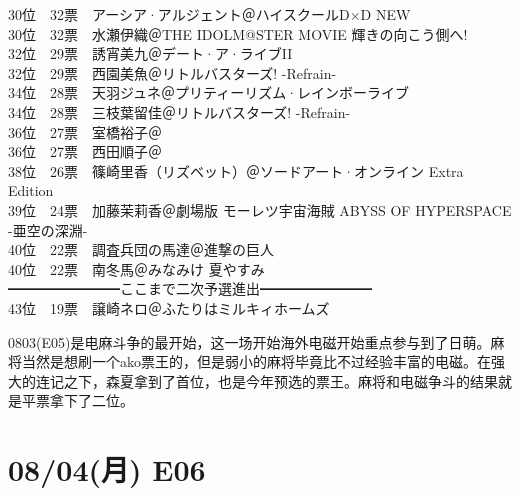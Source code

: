 {    30位　32票　アーシア·アルジェント＠ハイスクールD×D NEW\\
    30位　32票　水瀬伊織＠THE IDOLM@STER MOVIE 輝きの向こう側へ!\\
    32位　29票　誘宵美九＠デート·ア·ライブII\\
    32位　29票　西園美魚＠リトルバスターズ! -Refrain-\\
    34位　28票　天羽ジュネ＠プリティーリズム·レインボーライブ\\
    34位　28票　三枝葉留佳＠リトルバスターズ! -Refrain-\\
    36位　27票　室橋裕子＠\Saki\\
    36位　27票　西田順子＠\Saki\\
    38位　26票　篠崎里香（リズベット）＠ソードアート·オンライン Extra Edition\\
    39位　24票　加藤茉莉香＠劇場版 モーレツ宇宙海賊 ABYSS OF HYPERSPACE -亜空の深淵-\\
    40位　22票　調査兵団の馬達＠進撃の巨人\\
    40位　22票　南冬馬＠みなみけ 夏やすみ\\
    ━━━━━━━━ここまで二次予選進出━━━━━━━━\\
    43位　19票　譲崎ネロ＠ふたりはミルキィホームズ
}

0803(E05)是电麻斗争的最开始，这一场开始海外电磁开始重点参与到了日萌。麻将当然是想刷一个ako票王的，但是弱小的麻将毕竟比不过经验丰富的电磁。在强大的连记之下，森夏拿到了首位，也是今年预选的票王。麻将和电磁争斗的结果就是平票拿下了二位。

\section{08/04(月) E06}

